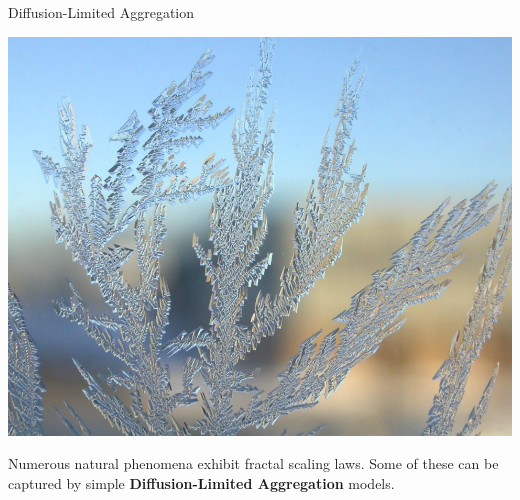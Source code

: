 \documentclass[usenames, dvipsnames, aspectratio=169]{beamer}
\begin{document}
\begin{frame}[t, c]{Diffusion-Limited Aggregation}{}
  \vfill
  \large

  \begin{minipage}{.48\textwidth}
    \includegraphics[width=\textwidth]{ice_dla}
  \end{minipage}%
  \hfill
  \begin{minipage}{.48\textwidth}
    Numerous natural phenomena exhibit fractal scaling laws.
    Some of these can be captured by simple \textbf{\alert{Diffusion-Limited Aggregation}} models.
  \end{minipage}

  \vfill
\end{frame}
\end{document}
